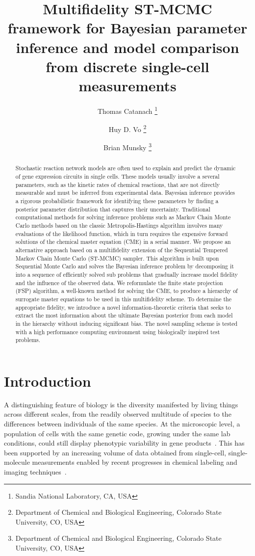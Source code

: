 \documentclass[1p]{article}
\title{Multifidelity ST-MCMC framework for Bayesian parameter inference and model comparison from discrete single-cell measurements}
\author{
Thomas Catanach
  \thanks{
  Sandia National Laboratory, CA, USA
}
\and
Huy D. Vo
  \thanks{
  Department of Chemical and Biological Engineering, Colorado State University, CO, USA
}
\and
Brian Munsky
  \thanks{
  Department of Chemical and Biological Engineering, Colorado State University, CO, USA
}
}
\begin{document}
\maketitle
\begin{abstract}
Stochastic reaction network models are often used to explain and predict the dynamic of gene expression circuits in single cells. These models usually involve a several parameters, such as the kinetic rates of chemical reactions, that are not directly measurable and must be inferred from experimental data.
 Bayesian inference provides a rigorous probabilistic framework for identifying these parameters by finding a posterior parameter distribution that captures their uncertainty.
 Traditional computational methods for solving inference problems such as Markov Chain Monte Carlo methods based on the classic Metropolis-Hastings algorithm involves many evaluations of the likelihood function, which in turn requires the expensive forward solutions of the chemical master equation (CME) in a serial manner.
 We propose an alternative approach based on a multifidelity extension of the Sequential Tempered Markov Chain Monte Carlo (ST-MCMC) sampler.
 This algorithm is built upon Sequential Monte Carlo and solves the Bayesian inference problem by decomposing it into a sequence of efficiently solved sub problems that gradually increase model fidelity and the influence of the observed data.
 We reformulate the finite state projection (FSP) algorithm, a well-known method for solving the CME, to produce a hierarchy of surrogate master equations to be used in this multifidelity scheme.
 To determine the appropriate fidelity, we introduce a novel information-theoretic criteria that seeks to extract the most information about the ultimate Bayesian posterior from each model in the hierarchy without inducing significant bias.
 The novel sampling scheme is tested with a high performance computing environment using biologically inspired test problems.
\end{abstract}

\section{Introduction}
A distinguishing feature of biology is the diversity manifested by living things across different scales, from the readily observed multitude of species to the differences between individuals of the same species.
At the microscopic level, a population of cells with the same genetic code, growing under the same lab conditions, could still display phenotypic variability in gene products~\cite{Elowitz2000}.
This has been supported by an increasing volume of data obtained from single-cell, single-molecule measurements enabled by recent progresses in chemical labeling and imaging techniques~\cite{Raj2008}.
\end{document}
